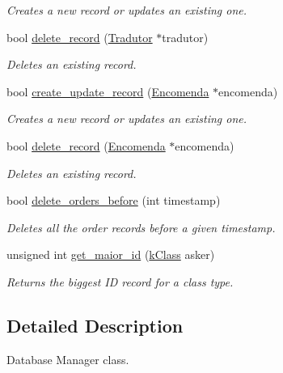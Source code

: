 \begin{DoxyCompactItemize}
\begin{DoxyCompactList}\small\item\em Creates a new record or updates an existing one. \end{DoxyCompactList}\item 
bool \hyperlink{class_database_manager_a861c8ab275b7d9e100ebb71889578c40}{delete\-\_\-record} (\hyperlink{class_tradutor}{Tradutor} $\ast$tradutor)
\begin{DoxyCompactList}\small\item\em Deletes an existing record. \end{DoxyCompactList}\item 
bool \hyperlink{class_database_manager_a10fd54af873e6902a3a6ee45f71eb42c}{create\-\_\-update\-\_\-record} (\hyperlink{class_encomenda}{Encomenda} $\ast$encomenda)
\begin{DoxyCompactList}\small\item\em Creates a new record or updates an existing one. \end{DoxyCompactList}\item 
bool \hyperlink{class_database_manager_aa78e5396d0be88098a97703f31fb72ec}{delete\-\_\-record} (\hyperlink{class_encomenda}{Encomenda} $\ast$encomenda)
\begin{DoxyCompactList}\small\item\em Deletes an existing record. \end{DoxyCompactList}\item 
bool \hyperlink{class_database_manager_ab1c3330c1db922baf135103db0527fa8}{delete\-\_\-orders\-\_\-before} (int timestamp)
\begin{DoxyCompactList}\small\item\em Deletes all the order records before a given timestamp. \end{DoxyCompactList}\item 
unsigned int \hyperlink{class_database_manager_a5af3db3952fc2af64a43fd0403138c04}{get\-\_\-maior\-\_\-id} (\hyperlink{_database_manager_8h_ad36b2b2507c9846942e0b412d07e5438}{k\-Class} asker)
\begin{DoxyCompactList}\small\item\em Returns the biggest I\-D record for a class type. \end{DoxyCompactList}\end{DoxyCompactItemize}


\subsection{Detailed Description}
Database Manager class. 

